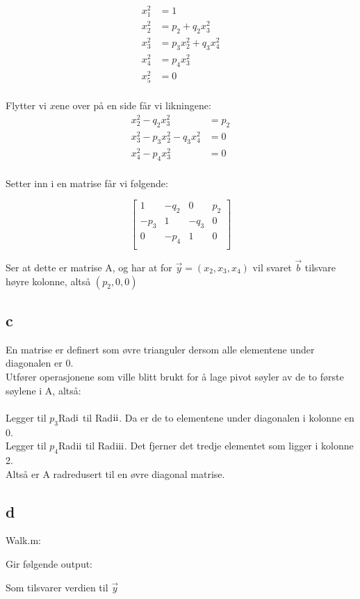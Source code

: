 \documentclass[a4paper, norsk, twoside, 10pt]{article}
\newcommand{\RN}[1]{
  \textup{\uppercase\expandafter{\romannumeral#1}}%
}
\begin{document}
\begin{flushleft}
   \begin{align*}
     x_{1}^{2} &= 1 \\
     x_{2}^{2} &= p_{2} + q_{2}x_{3}^{2} \\
     x_{3}^{2} &= p_{3}x_{2}^{2} + q_{3}x_{4}^{2}\\
     x_{4}^{2} &= p_{4}x_{3}^{2}\\
     x_{5}^{2} &= 0 \\
   \end{align*}   

   Flytter vi $x$ene over på en side får vi likningene:
   \begin{align*}
     x_{2}^{2}  - q_{2}x_{3}^{2} &= p_{2}\\
     x_{3}^{2} - p_{3}x_{2}^{2} - q_{3}x_{4}^{2}&= 0\\
     x_{4}^{2} - p_{4}x_{3}^{2} &= 0\\
   \end{align*}   
   
   Setter inn i en matrise får vi følgende:

   \[\begin{bmatrix}
   1 & - q_{2} & 0 & p_{2}\\
   -p_{3} & 1 & -q_{3} & 0 \\
   0 & -p_{4} & 1 & 0 \\
   \end{bmatrix}\]

   Ser at dette er matrise A, og har at for $\vec{y} = (x_{2}, x_{3}, x_{4})$ vil svaret $\vec{b}$ tilsvare høyre kolonne, altså $(p_{2}, 0, 0)$



   \subsection*{c}
   En matrise er definert som øvre trianguler dersom alle elementene under diagonalen er 0. \\

   Utfører operasjonene som ville blitt brukt for å lage pivot søyler av de to første søylene i A, altså: \\ \ \\
   Legger til $p_{3}$Rad$\RN{1}$ til Rad$\RN{2}$. Da er de to elementene under diagonalen i kolonne en 0.\\
   Legger til $p_{4}$Rad$\RN{2}$ til Rad$\RN{3}$. Det fjerner det tredje elementet som ligger i kolonne 2.
   \\
   Altså er A radredusert til en øvre diagonal matrise.



   \subsection*{d}

   Walk.m:
  
 
  Gir følgende output:
  

  Som tilsvarer verdien til $\vec{y}$
  \end{flushleft}
\end{document}
